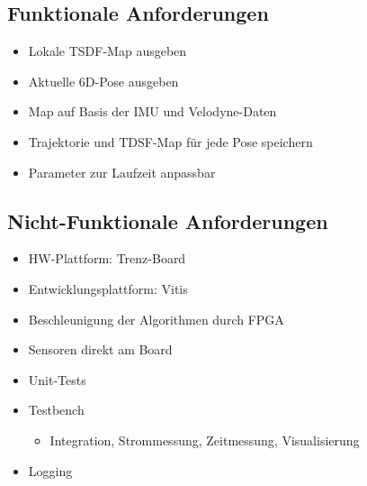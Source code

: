 \documentclass{beamer}
\begin{document}
\subsection{Funktionale Anforderungen}
\begin{frame}{\subsecname}
\begin{itemize}
\item{Lokale TSDF-Map ausgeben}
\item{Aktuelle 6D-Pose ausgeben}
\item{Map auf Basis der IMU und Velodyne-Daten}
\item{Trajektorie und TDSF-Map für jede Pose speichern}
\item{Parameter zur Laufzeit anpassbar}
\end{itemize}
\begin{center}
\end{center}
\end{frame}

\subsection{Nicht-Funktionale Anforderungen}
\begin{frame}{\subsecname}
\begin{itemize}
\item{HW-Plattform: Trenz-Board}
\item{Entwicklungsplattform: Vitis}
\item{Beschleunigung der Algorithmen durch FPGA}
\item{Sensoren direkt am Board}
\item{Unit-Tests}
\item{Testbench}
\begin{itemize}
\item{Integration, Strommessung, Zeitmessung, Visualisierung}
\end{itemize}
\item{Logging}
\end{itemize}
\end{frame}
\end{document}

